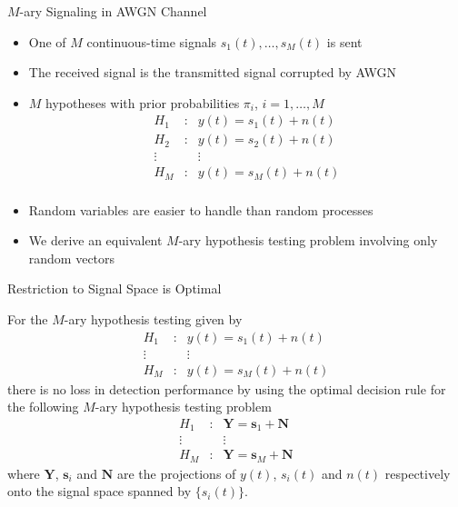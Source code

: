 \documentclass[t]{beamer}
\begin{document}
\begin{frame}{$M$-ary Signaling in AWGN Channel}
  \footnotesize
  \begin{itemize}
    \item One of $M$ continuous-time signals $s_1(t), \ldots, s_M(t)$ is sent
    \pause
    \item The received signal is the transmitted signal corrupted by AWGN
    \pause
    \item $M$ hypotheses with prior probabilities $\pi_i$, $i=1,\ldots,M$
      \begin{equation*}
        \begin{array}{ccc}
            H_1 & : & y(t) = s_1(t) + n(t) \\
            H_2 & : & y(t) = s_2(t) + n(t) \\
            \vdots &   &  \vdots          \\
            H_M & : & y(t) = s_M(t) + n(t) \\
        \end{array}
      \end{equation*}
    \pause
    \item Random variables are easier to handle than random processes
    \pause
    \item We derive an equivalent $M$-ary hypothesis testing problem involving only random vectors
  \end{itemize}
  \normalsize
\end{frame}

\begin{frame}{Restriction to Signal Space is Optimal}
  \footnotesize
  \begin{theorem}
    For the $M$-ary hypothesis testing given by
      \begin{equation*}
        \begin{array}{ccc}
            H_1 & : & y(t) = s_1(t) + n(t) \\
            \vdots &   &  \vdots          \\
            H_M & : & y(t) = s_M(t) + n(t) 
        \end{array}
      \end{equation*}
    there is no loss in detection performance by using the optimal
    decision rule for the following $M$-ary hypothesis testing problem
      \begin{equation*}
        \begin{array}{ccc}
            H_1 & : & \mathbf{Y} = \mathbf{s}_1 + \mathbf{N} \\
            \vdots &   &  \vdots          \\
            H_M & : & \mathbf{Y} = \mathbf{s}_M + \mathbf{N}
        \end{array}
      \end{equation*}
      where $\mathbf{Y}$, $\mathbf{s}_i$ and $\mathbf{N}$ are the projections of $y(t)$, $s_i(t)$ and $n(t)$ respectively onto the signal space spanned by $\{s_i(t)\}$.
  \end{theorem}
  \normalsize
\end{frame}
\end{document}
